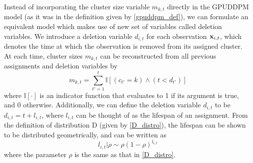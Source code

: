 \documentclass[twocolumn, final]{svjour3}
\begin{document}
Instead of incorporating the cluster size variable $m_{k,t}$ directly in the GPUDDPM model (as it was in the definition given by \eqref{gpuddpm_def}), we can formulate an equivalent model which makes use of new set of variables called deletion variables. We introduce a deletion variable $d_{i,t}$ for each observation $\bold{x}_{i,t}$, which denotes the time at which the observation is removed from its assigned cluster. At each time, cluster sizes $m_{k,t}$ can be reconstructed from all previous assignments and deletion variables by
\begin{equation}
\label{compute_clust_size}
m_{k,t} = \sum_{t' = 1}^{t} \mathbb{I}[(c_{t'}=k) \wedge (t < d_{t'})]
\end{equation}
where $\mathbb{I}[\cdot]$ is an indicator function that evaluates to 1 if its argument is true, and 0 otherwise. Additionally, we can define the deletion variable $d_{i,t}$ to be $d_{i,t} = t + l_{i,t}$, where $l_{i,t}$ can be thought of as the lifespan of an assignment. From the definition of distribution D (given by \eqref{D_distro}), the lifespan can be shown to be distributed geometrically, and can be written as
\begin{equation}
\label{del_rho_form}
l_{i,t} | \rho  \sim  \rho(1 - \rho)^{l_{i,t}}
\end{equation}
where the parameter $\rho$ is the same as that in \eqref{D_distro}.
\end{document}

